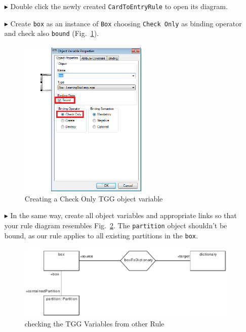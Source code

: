 \begin{enumerate}
\item[$\blacktriangleright$] Double click the newly created \texttt{CardToEntryRule} to open its diagram.
\item[$\blacktriangleright$] Create \texttt{box} as an instance of \texttt{Box} choosing \texttt{Check Only} as binding operator and check also \texttt{bound} (Fig.~\ref{fig:bound_tgg_variable}).

\begin{figure}[htbp]
\begin{center}
  \includegraphics[width=0.6\textwidth]{pics/tggBilder/tggRule/tgg17}
  \caption{Creating a Check Only TGG object variable}  
  \label{fig:bound_tgg_variable}
\end{center}
\end{figure}

\item[$\blacktriangleright$] In the same way, create all object variables and appropriate links so that your rule diagram resembles Fig.~\ref{fig:check_bound_variables}. 
The \texttt{partition} object shouldn't be bound, as our rule applies to all existing partitions in the \texttt{box}.

\begin{figure}[htbp]
\begin{center}
  \includegraphics[width=\textwidth]{pics/tggBilder/tggRule/tgg18}
  \caption{checking the TGG Variables from other Rule }  
  \label{fig:check_bound_variables}
\end{center}
\end{figure}

\end{enumerate}

